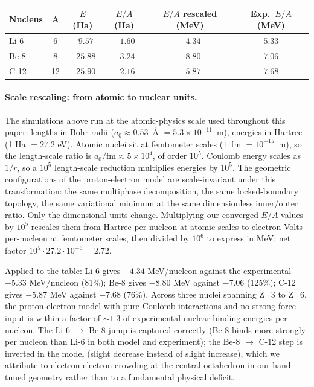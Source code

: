\documentclass[11pt]{article}
\begin{document}
\begin{center}
\begin{tabular}{lccccc}
\hline
\textbf{Nucleus} & \textbf{A} & \textbf{$E$ (Ha)} & \textbf{$E/A$ (Ha)} & \textbf{$E/A$ rescaled (MeV)} & \textbf{Exp.\ $E/A$ (MeV)} \\
\hline
Li-6 &  6 & $-9.57$  & $-1.60$ & $-4.34$ & $5.33$ \\
Be-8 &  8 & $-25.88$ & $-3.24$ & $-8.80$ & $7.06$ \\
C-12 & 12 & $-25.90$ & $-2.16$ & $-5.87$ & $7.68$ \\
\hline
\end{tabular}
\end{center}

\paragraph{Scale rescaling: from atomic to nuclear units.}
The simulations above run at the atomic-physics scale used throughout this paper: lengths in Bohr radii ($a_0 \approx 0.53$~\AA{} $= 5.3 \times 10^{-11}$~m), energies in Hartree (1 Ha $= 27.2$ eV). Atomic nuclei sit at femtometer scales ($1$~fm $= 10^{-15}$~m), so the length-scale ratio is $a_0/\mathrm{fm} \approx 5 \times 10^4$, of order $10^5$. Coulomb energy scales as $1/r$, so a $10^5$ length-scale reduction multiplies energies by $10^5$. The geometric configurations of the proton-electron model are scale-invariant under this transformation: the same multiphase decomposition, the same locked-boundary topology, the same variational minimum at the same dimensionless inner/outer ratio. Only the dimensional units change. Multiplying our converged $E/A$ values by $10^5$ rescales them from Hartree-per-nucleon at atomic scales to electron-Volts-per-nucleon at femtometer scales, then divided by $10^6$ to express in MeV; net factor $10^5 \cdot 27.2 \cdot 10^{-6} = 2.72$.

Applied to the table: Li-6 gives $-4.34$ MeV/nucleon against the experimental $-5.33$ MeV/nucleon (81\%); Be-8 gives $-8.80$ MeV against $-7.06$ (125\%); C-12 gives $-5.87$ MeV against $-7.68$ (76\%). Across three nuclei spanning Z=3 to Z=6, the proton-electron model with pure Coulomb interactions and no strong-force input is within a factor of $\sim 1.3$ of experimental nuclear binding energies per nucleon. The Li-6 $\to$ Be-8 jump is captured correctly (Be-8 binds more strongly per nucleon than Li-6 in both model and experiment); the Be-8 $\to$ C-12 step is inverted in the model (slight decrease instead of slight increase), which we attribute to electron-electron crowding at the central octahedron in our hand-tuned geometry rather than to a fundamental physical deficit.
\end{document}
